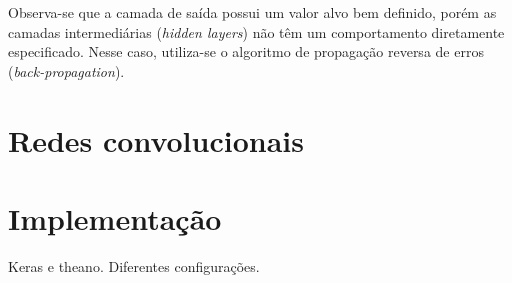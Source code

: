 Observa-se que a camada de saída possui um valor alvo bem definido, porém as camadas intermediárias (\textit{hidden layers}) não têm um comportamento diretamente especificado. Nesse caso, utiliza-se o algoritmo de propagação reversa de erros (\textit{back-propagation}).


\section{Redes convolucionais}

\section{Implementação}
Keras e theano. Diferentes configurações.
